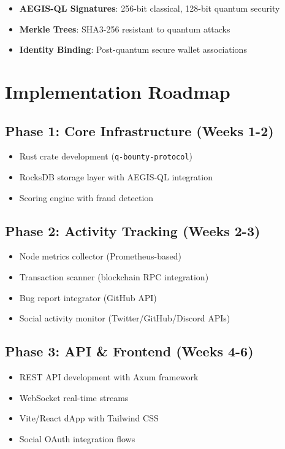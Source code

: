 \documentclass[11pt,a4paper]{article}
\begin{document}
\begin{itemize}
    \item \textbf{AEGIS-QL Signatures}: 256-bit classical, 128-bit quantum security
    \item \textbf{Merkle Trees}: SHA3-256 resistant to quantum attacks
    \item \textbf{Identity Binding}: Post-quantum secure wallet associations
\end{itemize}

\section{Implementation Roadmap}

\subsection{Phase 1: Core Infrastructure (Weeks 1-2)}
\begin{itemize}
    \item Rust crate development (\texttt{q-bounty-protocol})
    \item RocksDB storage layer with AEGIS-QL integration
    \item Scoring engine with fraud detection
\end{itemize}

\subsection{Phase 2: Activity Tracking (Weeks 2-3)}
\begin{itemize}
    \item Node metrics collector (Prometheus-based)
    \item Transaction scanner (blockchain RPC integration)
    \item Bug report integrator (GitHub API)
    \item Social activity monitor (Twitter/GitHub/Discord APIs)
\end{itemize}

\subsection{Phase 3: API \& Frontend (Weeks 4-6)}
\begin{itemize}
    \item REST API development with Axum framework
    \item WebSocket real-time streams
    \item Vite/React dApp with Tailwind CSS
    \item Social OAuth integration flows
\end{itemize}
\end{document}
